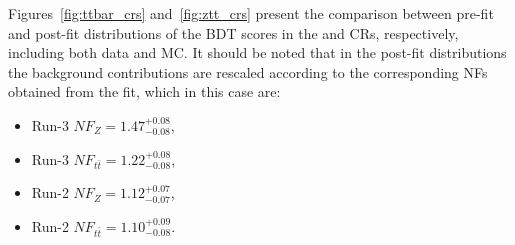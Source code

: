 Figures~\ref{fig:ttbar_crs} and~\ref{fig:ztt_crs} present the comparison between pre-fit and post-fit distributions of the BDT scores in the \ttbar and \ztautau CRs, respectively, including both data and MC. It should be noted that in the post-fit distributions the background contributions are rescaled according to the corresponding NFs obtained from the fit, which in this case are:
\begin{itemize}
  \small
  \item Run-3 $NF_{Z} = 1.47^{+0.08}_{-0.08}$,
  \item Run-3 $NF_{t\bar{t}} = 1.22^{+0.08}_{-0.08}$,
  \item Run-2 $NF_{Z} = 1.12^{+0.07}_{-0.07}$,
  \item Run-2 $NF_{t\bar{t}} = 1.10^{+0.09}_{-0.08}$.
\end{itemize}
